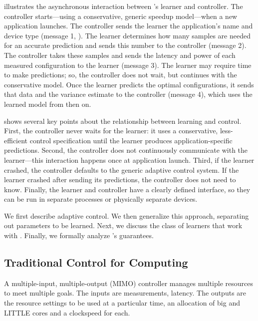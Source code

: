  illustrates the asynchronous interaction between
\SYSTEM{}'s learner and controller. The controller starts---using a
conservative, generic speedup model---when a new application launches.
The controller sends the learner the application's name and device
type (message 1, ).  The learner determines how
many samples are needed for an accurate prediction and sends this
number to the controller (message 2).  The controller takes these
samples and sends the latency and power of each measured
configuration to the learner (message 3).  The learner may require
time to make predictions; so, the controller does not wait, but
continues with the conservative model.  Once the learner predicts the
optimal configurations, it sends that data and the variance estimate
to the controller (message 4), which uses the learned model from then
on.

 shows several key points about the relationship
between learning and control.  First, the controller never waits for
the learner: it uses a conservative, less-efficient control
specification until the learner produces application-specific
predictions.  Second, the controller does not continuously communicate
with the learner---this interaction happens once at application
launch.  Third, if the learner crashed, the controller defaults to the
generic adaptive control system.  If the learner crashed after sending
its predictions, the controller does not need to know.  Finally, the
learner and controller have a clearly defined interface, so they can
be run in separate processes or physically separate devices.

We first describe adaptive control.  We then generalize this approach,
separating out parameters to be learned.  Next, we discuss the class
of learners that work with \SYSTEM{}.  Finally, we formally analyze
\SYSTEM{}'s guarantees.


\subsection{Traditional Control for Computing}
A multiple-input, multiple-output (MIMO) controller manages multiple
resources to meet multiple goals.  The inputs are measurements, \eg{}
latency.  The outputs are the resource settings to be used at a
particular time, \eg{} an allocation of big and LITTLE cores and a
clockspeed for each.

